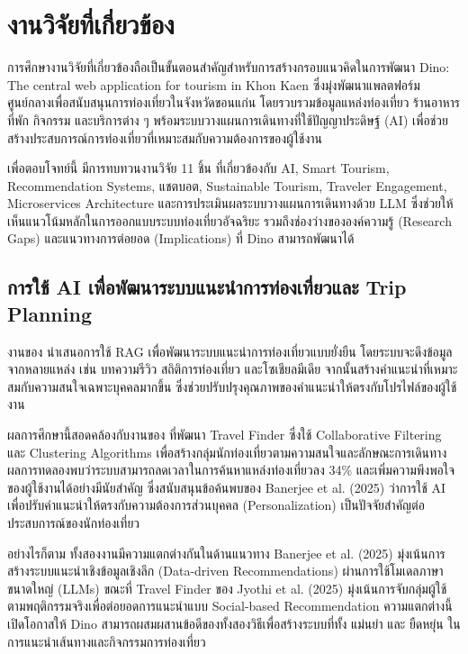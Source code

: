\section{งานวิจัยที่เกี่ยวข้อง}

การศึกษางานวิจัยที่เกี่ยวข้องถือเป็นขั้นตอนสำคัญสำหรับการสร้างกรอบแนวคิดในการพัฒนา Dino: The central web application for tourism in Khon Kaen ซึ่งมุ่งพัฒนาแพลตฟอร์มศูนย์กลางเพื่อสนับสนุนการท่องเที่ยวในจังหวัดขอนแก่น โดยรวบรวมข้อมูลแหล่งท่องเที่ยว ร้านอาหาร ที่พัก กิจกรรม และบริการต่าง ๆ พร้อมระบบวางแผนการเดินทางที่ใช้ปัญญาประดิษฐ์ (AI) เพื่อช่วยสร้างประสบการณ์การท่องเที่ยวที่เหมาะสมกับความต้องการของผู้ใช้งาน

เพื่อตอบโจทย์นี้ มีการทบทวนงานวิจัย 11 ชิ้น ที่เกี่ยวข้องกับ AI, Smart Tourism, Recommendation Systems, แชตบอต, Sustainable Tourism, Traveler Engagement, Microservices Architecture และการประเมินผลระบบวางแผนการเดินทางด้วย LLM ซึ่งช่วยให้เห็นแนวโน้มหลักในการออกแบบระบบท่องเที่ยวอัจฉริยะ รวมถึงช่องว่างขององค์ความรู้ (Research Gaps) และแนวทางการต่อยอด (Implications) ที่ Dino สามารถพัฒนาได้

\subsection{การใช้ AI เพื่อพัฒนาระบบแนะนำการท่องเที่ยวและ Trip Planning}

งานของ \textcite{banerjee2025} นำเสนอการใช้ RAG เพื่อพัฒนาระบบแนะนำการท่องเที่ยวแบบยั่งยืน โดยระบบจะดึงข้อมูลจากหลายแหล่ง เช่น บทความรีวิว สถิติการท่องเที่ยว และโซเชียลมีเดีย จากนั้นสร้างคำแนะนำที่เหมาะสมกับความสนใจเฉพาะบุคคลมากขึ้น ซึ่งช่วยปรับปรุงคุณภาพของคำแนะนำให้ตรงกับโปรไฟล์ของผู้ใช้งาน

ผลการศึกษานี้สอดคล้องกับงานของ \textcite{jyothi2025} ที่พัฒนา Travel Finder ซึ่งใช้ Collaborative Filtering และ Clustering Algorithms เพื่อสร้างกลุ่มนักท่องเที่ยวตามความสนใจและลักษณะการเดินทาง ผลการทดลองพบว่าระบบสามารถลดเวลาในการค้นหาแหล่งท่องเที่ยวลง 34\% และเพิ่มความพึงพอใจของผู้ใช้งานได้อย่างมีนัยสำคัญ ซึ่งสนับสนุนข้อค้นพบของ Banerjee et al. (2025) ว่าการใช้ AI เพื่อปรับคำแนะนำให้ตรงกับความต้องการส่วนบุคคล (Personalization) เป็นปัจจัยสำคัญต่อประสบการณ์ของนักท่องเที่ยว

อย่างไรก็ตาม ทั้งสองงานมีความแตกต่างกันในด้านแนวทาง Banerjee et al. (2025) มุ่งเน้นการสร้างระบบแนะนำเชิงข้อมูลเชิงลึก (Data-driven Recommendations) ผ่านการใช้โมเดลภาษาขนาดใหญ่ (LLMs) ขณะที่ Travel Finder ของ Jyothi et al. (2025) มุ่งเน้นการจับกลุ่มผู้ใช้ตามพฤติกรรมจริงเพื่อต่อยอดการแนะนำแบบ Social-based Recommendation ความแตกต่างนี้เปิดโอกาสให้ Dino สามารถผสมผสานข้อดีของทั้งสองวิธีเพื่อสร้างระบบที่ทั้ง แม่นยำ และ ยืดหยุ่น ในการแนะนำเส้นทางและกิจกรรมการท่องเที่ยว

